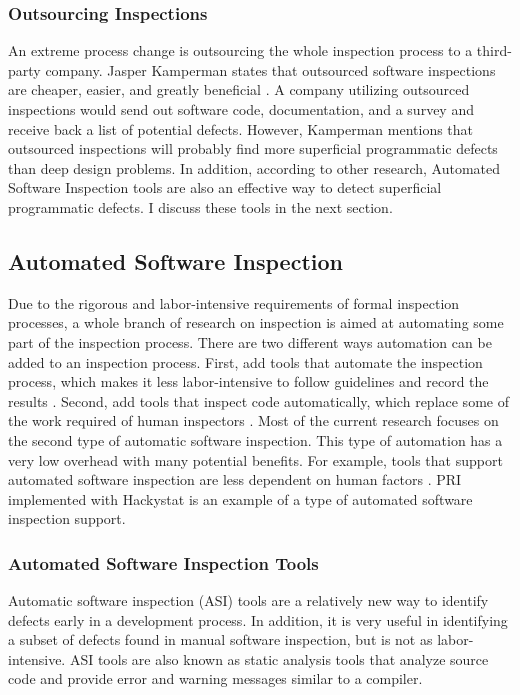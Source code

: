 \subsubsection{Outsourcing Inspections}
An extreme process change is outsourcing the whole inspection process to a
third-party company. Jasper Kamperman states that outsourced software
inspections are cheaper, easier, and greatly beneficial \cite{Kamperman05}.
A company utilizing outsourced inspections would send out software code,
documentation, and a survey and receive back a list of potential defects.
However, Kamperman mentions that outsourced inspections will probably find
more superficial programmatic defects than deep design problems. In
addition, according to other research, Automated Software Inspection tools
are also an effective way to detect superficial programmatic defects. I
discuss these tools in the next section.

\subsection{Automated Software Inspection}
\label{subsection:automated-software-inspection}
Due to the rigorous and labor-intensive requirements of formal inspection
processes, a whole branch of research on inspection is aimed at automating
some part of the inspection process. There are two different ways
automation can be added to an inspection process. First, add tools that
automate the inspection process, which makes it less labor-intensive to
follow guidelines and record the results \cite{vanEmden02}. Second, add
tools that inspect code automatically, which replace some of the work
required of human inspectors \cite{vanEmden02}. Most of the current
research focuses on the second type of automatic software inspection. This
type of automation has a very low overhead with many potential benefits.
For example, tools that support automated software inspection are less
dependent on human factors \cite{NagappanWPSV04}. PRI implemented with
Hackystat is an example of a type of automated software inspection support.

\subsubsection{Automated Software Inspection Tools}
Automatic software inspection (ASI) tools are a relatively new way to
identify defects early in a development process. In addition, it is very
useful in identifying a subset of defects found in manual software
inspection, but is not as labor-intensive. ASI tools are also known as
static analysis tools that analyze source code and provide error and
warning messages similar to a compiler.

